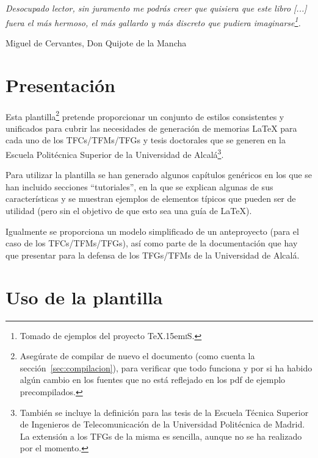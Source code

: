 \documentclass[spanish,openright]{book}
\def\texis{\TeX \raise.15em\hbox{\textsc{i}}S}
\newenvironment{FraseCelebre}{\begin{list}{}{\setlength{\leftmargin}{0.5\textwidth}\setlength{\parsep}{0cm}\addtolength{\topsep}{0.5cm}}
}
{\unskip \end{list}}
\newenvironment{Frase}{\item \begin{flushright}\small\em}{\end{flushright}}
\newenvironment{Fuente}{\item \begin{flushright}\small}{\end{flushright}}
\begin{document}
\begin{FraseCelebre}
\begin{Frase}
Desocupado lector, sin juramento me podrás creer que quisiera que este
libro [...] fuera el más hermoso, el más gallardo y más discreto que
pudiera imaginarse\footnote{Tomado de ejemplos del proyecto \texis{}.}.
\end{Frase}
\begin{Fuente}
Miguel de Cervantes, Don Quijote de la Mancha
\end{Fuente}
\end{FraseCelebre}


\section{Presentación}
\label{sec:presentacion}

Esta plantilla\footnote{Asegúrate de compilar de nuevo el documento
(como cuenta la sección~\ref{sec:compilacion}), para verificar que
todo funciona y por si ha habido algún cambio en los fuentes que no
está reflejado en los pdf de ejemplo precompilados.} pretende
proporcionar un conjunto de estilos consistentes y unificados para
cubrir las necesidades de generación de memorias \LaTeX{} para cada uno
de los TFCs/TFMs/TFGs y tesis doctorales que se generen en la Escuela
Politécnica Superior de la Universidad de Alcalá\footnote{También se
incluye la definición para las tesis de la Escuela Técnica Superior de
Ingenieros de Telecomunicación de la Universidad Politécnica de
Madrid. La extensión a los TFGs de la misma es sencilla, aunque no se
ha realizado por el momento.}.

Para utilizar la plantilla se han generado algunos capítulos genéricos
en los que se han incluido secciones ``tutoriales'', en la que se
explican algunas de sus características y se muestran ejemplos de
elementos típicos que pueden ser de utilidad (pero sin el objetivo de
que esto sea una guía de \LaTeX{}).

Igualmente se proporciona un modelo simplificado de un anteproyecto
(para el caso de los TFCs/TFMs/TFGs), así como parte de la documentación
que hay que presentar para la defensa de los TFGs/TFMs de la Universidad
de Alcalá.



\section{Uso de la plantilla}
\label{sec:uso-generico-de}
\end{document}
